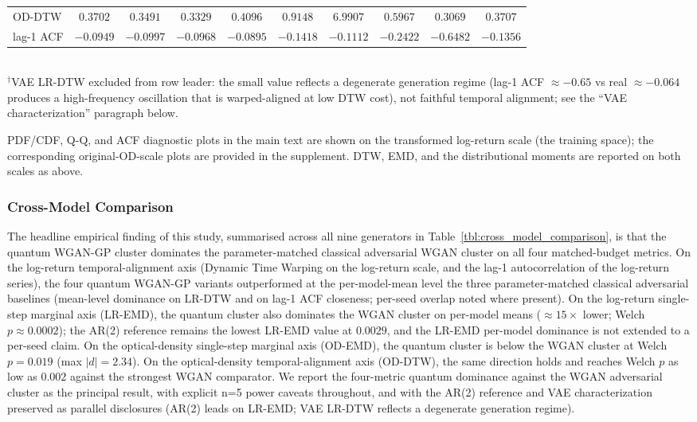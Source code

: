 \documentclass[12pt,twocolumn]{article}
\begin{document}
\begin{table}[!htbp]
\begin{tabular}{@{}lccccccccc@{}}
OD-DTW     & $0.3702$ & $0.3491$ & $\mathbf{0.3329}$ & $0.4096$ & $0.9148$ & $6.9907$ & $0.5967$ & $0.3069$ & $0.3707$ \\
lag-1 ACF  & $-0.0949$ & $-0.0997$ & $-0.0968$ & $\mathbf{-0.0895}$ & $-0.1418$ & $-0.1112$ & $-0.2422$ & $-0.6482$ & $-0.1356$ \\
\bottomrule
\end{tabular}
\\[2pt]
{\scriptsize $^{\dagger}$VAE LR-DTW excluded from row leader: the small
value reflects a degenerate generation regime (lag-1 ACF
$\approx -0.65$ vs real $\approx -0.064$ produces a high-frequency
oscillation that is warped-aligned at low DTW cost), not faithful
temporal alignment; see the ``VAE characterization'' paragraph below.}
\end{table}

PDF/CDF, Q-Q, and ACF diagnostic plots in the main text are shown on the
transformed log-return scale (the training space); the corresponding
original-OD-scale plots are provided in the supplement. DTW,
EMD, and the distributional moments are reported on both scales as above.

\subsubsection*{Cross-Model Comparison}

The headline empirical finding of this study, summarised across all
nine generators in Table~\ref{tbl:cross_model_comparison}, is that the
quantum WGAN-GP cluster dominates the parameter-matched classical
adversarial WGAN cluster on all four matched-budget metrics. On the
log-return temporal-alignment axis (Dynamic Time Warping on the
log-return scale, and the lag-1 autocorrelation of the log-return
series), the four quantum WGAN-GP variants outperformed at the per-model-mean level
the three parameter-matched classical adversarial baselines (mean-level
dominance on LR-DTW and on lag-1 ACF closeness; per-seed overlap noted
where present). On the log-return single-step marginal axis (LR-EMD),
the quantum cluster also dominates the WGAN cluster on per-model means
($\approx 15\times$ lower; Welch $p \approx 0.0002$); the AR(2) reference
remains the lowest LR-EMD value at $0.0029$, and the LR-EMD per-model
dominance is not extended to a per-seed claim. On the optical-density
single-step marginal axis (OD-EMD), the quantum cluster is below the
WGAN cluster at Welch $p = 0.019$ (max $|d| = 2.34$). On the
optical-density temporal-alignment axis (OD-DTW), the same direction
holds and reaches Welch $p$ as low as $0.002$ against the strongest WGAN
comparator. We report the four-metric quantum dominance against the WGAN
adversarial cluster as the principal result, with explicit n=5 power
caveats throughout, and with the AR(2) reference and VAE
characterization preserved as parallel disclosures (AR(2) leads on
LR-EMD; VAE LR-DTW reflects a degenerate generation regime).
\end{document}
